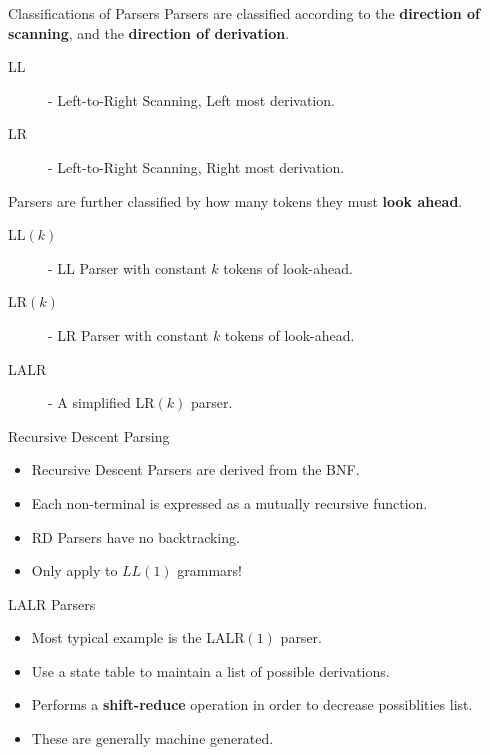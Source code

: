 \documentclass[handout]{beamer}
\begin{document}
\begin{frame}{Classifications of Parsers}  
    Parsers are classified according to the {\bf direction of scanning}, and the {\bf direction of derivation}.
    \begin{description}
        \item[LL] - Left-to-Right Scanning, Left most derivation.
        \item[LR] - Left-to-Right Scanning, Right most derivation.
    \end{description}
    Parsers are further classified by how many tokens they must {\bf look ahead}.
    \begin{description}
        \item[LL$(k)$] - LL Parser with constant $k$ tokens of look-ahead.
        \item[LR$(k)$] - LR Parser with constant $k$ tokens of look-ahead.
        \item[LALR] - A simplified LR$(k)$ parser.
    \end{description}
\end{frame}
\begin{frame}[fragile]{Recursive Descent Parsing}
    \begin{itemize}
        \item Recursive Descent Parsers are derived from the BNF.
        \item Each non-terminal is expressed as a mutually recursive function.
        \item RD Parsers have no backtracking.
        \item Only apply to $LL(1)$ grammars!
    \end{itemize}
\end{frame}

\begin{frame}{LALR Parsers}
    \begin{itemize}
        \item Most typical example is the LALR$(1)$ parser.
        \item Use a state table to maintain a list of possible derivations.
        \item Performs a {\bf shift-reduce} operation in order to decrease possiblities list.
        \item These are generally machine generated.
    \end{itemize}
\end{frame}
\end{document}
